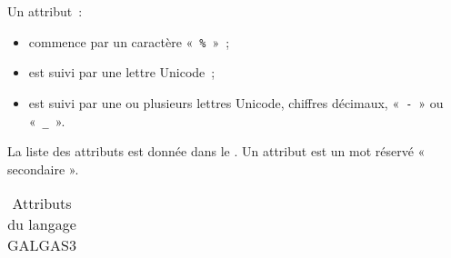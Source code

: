 
Un attribut~:
\begin{itemize}
  \item commence par un caractère «~\texttt{\%}~»~;
  \item est suivi par une lettre Unicode~;
  \item est suivi par une ou plusieurs lettres Unicode, chiffres décimaux, «~\texttt{-}~» ou «~\texttt{\_}~».
\end{itemize}

La liste des attributs est donnée dans le . Un attribut est un mot réservé « secondaire ».

\begin{table}[ht]
  \centering
  \begin{tabular}{llllllll}
    
  \end{tabular}
  \caption{Attributs du langage GALGAS3}
\end{table}



